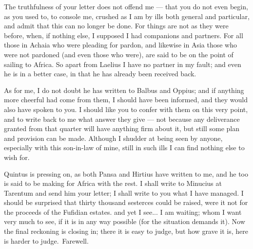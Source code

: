 

 The truthfulness of your letter does not offend me --- that you do not even begin, as you used to, to console me, crushed as I am by ills both general and particular, and admit that this can no longer be done. For things are not as they were before, when, if nothing else, I supposed I had companions and partners. For all those in Achaia who were pleading for pardon, and likewise in Asia those who were not pardoned (and even those who were), are said to be on the point of sailing to Africa. So apart from Laelius I have no partner in my fault; and even he is in a better case, in that he has already been received back.

 As for me, I do not doubt he has written to Balbus and Oppius; and if anything more cheerful had come from them, I should have been informed, and they would also have spoken to you. I should like you to confer with them on this very point, and to write back to me what answer they give --- not because any deliverance granted from that quarter will have anything firm about it, but still some plan and provision can be made. Although I shudder at being seen by anyone, especially with this son-in-law of mine, still in such ills I can find nothing else to wish for.

 Quintus is pressing on, as both Pansa and Hirtius have written to me, and he too is said to be making for Africa with the rest. I shall write to Minucius at Tarentum and send him your letter; I shall write to you what I have managed. I should be surprised that thirty thousand sesterces could be raised, were it not for the proceeds of the Fufidian estates. \dag and yet I see... I am waiting\dag; whom I want very much to see, if it is in any way possible (for the situation demands it). Now the final reckoning is closing in; \dag there it is easy to judge, but how grave it is, here is harder to judge.\dag\ Farewell.
